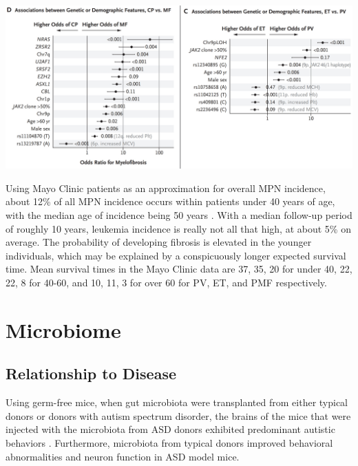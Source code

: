 \documentclass[]{book}
\newenvironment{Shaded}{\begin{snugshade}}{\end{snugshade}}
\newcommand{\KeywordTok}[1]{\textcolor[rgb]{0.13,0.29,0.53}{\textbf{#1}}}
\newcommand{\DataTypeTok}[1]{\textcolor[rgb]{0.13,0.29,0.53}{#1}}
\newcommand{\DecValTok}[1]{\textcolor[rgb]{0.00,0.00,0.81}{#1}}
\newcommand{\OtherTok}[1]{\textcolor[rgb]{0.56,0.35,0.01}{#1}}
\newcommand{\OperatorTok}[1]{\textcolor[rgb]{0.81,0.36,0.00}{\textbf{#1}}}
\newcommand{\NormalTok}[1]{#1}
\begin{document}
\includegraphics{images/06-3.jpg}

\begin{Shaded}
\end{Shaded}

\citep{grinfeld2018classification}

Using Mayo Clinic patients as an approximation for overall MPN
incidence, about 12\% of all MPN incidence occurs within patients under
40 years of age, with the median age of incidence being 50 years
\citep{szuber2018myeloproliferative}. With a median follow-up period of
roughly 10 years, leukemia incidence is really not all that high, at
about 5\% on average. The probability of developing fibrosis is elevated
in the younger individuals, which may be explained by a conspicuously
longer expected survival time. Mean survival times in the Mayo Clinic
data are 37, 35, 20 for under 40, 22, 22, 8 for 40-60, and 10, 11, 3 for
over 60 for PV, ET, and PMF respectively.

\chapter{Microbiome}\label{microbiome}

\section{Relationship to Disease}\label{relationship-to-disease}

Using germ-free mice, when gut microbiota were transplanted from either
typical donors or donors with autism spectrum disorder, the brains of
the mice that were injected with the microbiota from ASD donors
exhibited predominant autistic behaviors \citep{sharon2019human}.
Furthermore, microbiota from typical donors improved behavioral
abnormalities and neuron function in ASD model mice.
\end{document}
